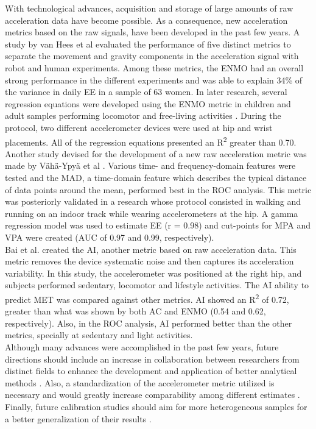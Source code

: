 \documentclass[11pt]{article}
\begin{document}
With technological advances, acquisition and storage of large amounts of raw acceleration data have become possible. As a consequence, new acceleration metrics based on the raw signals, have been developed in the past few years. A study by van Hees et al \citeyear{vanHees_2013} evaluated the performance of five distinct metrics to separate the movement and gravity components in the acceleration signal with robot and human experiments. Among these metrics, the ENMO had an overall strong performance in the different experiments and was able to explain 34\% of the variance in daily EE in a sample of 63 women. In later research, several regression equations were developed using the ENMO metric in children and adult samples performing locomotor and free-living activities \cite{Hildebrand_2014}. During the protocol, two different accelerometer devices were used at hip and wrist placements. All of the regression equations presented an R\textsuperscript{2} greater than 0.70. \\

Another study devised for the development of a new raw acceleration metric was made by V{\"a}h{\"a}-Ypy{\"a} et al \citeyear{Vaha-Ypya_2015}. Various time- and frequency-domain features were tested and the MAD, a time-domain feature which describes the typical distance of data points around the mean, performed best in the ROC analysis. This metric was posteriorly validated in a research \cite{Vaha-Ypya_2015b} whose protocol consisted in walking and running on an indoor track while wearing accelerometers at the hip. A gamma regression model was used to estimate EE (r = 0.98) and cut-points for MPA and VPA were created (AUC of 0.97 and 0.99, respectively). \\

Bai et al. \citeyear{Bai_2016} created the AI, another metric based on raw acceleration data. This metric removes the device systematic noise and then captures its acceleration variability. In this study, the accelerometer was positioned at the right hip, and subjects performed sedentary, locomotor and lifestyle activities. The AI ability to predict MET was compared against other metrics. AI showed an R\textsuperscript{2} of 0.72, greater than what was shown by both AC and ENMO (0.54 and 0.62, respectively). Also, in the ROC analysis, AI performed better than the other metrics, specially at sedentary and light activities. \\

Although many advances were accomplished in the past few years, future directions should include an increase in collaboration between researchers from distinct fields to enhance the development and application of better analytical methods \cite{Mendes_2018, Troiano_2014}. Also, a standardization of the accelerometer metric utilized is necessary and would greatly increase comparability among different estimates \cite{Mendes_2018}. Finally, future calibration studies should aim for more heterogeneous samples for a better generalization of their results \cite{Mendes_2018}.
\end{document}
